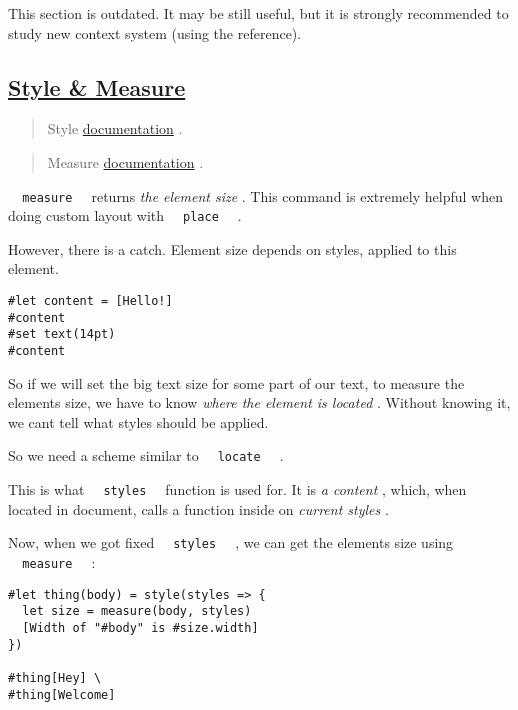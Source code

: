 This section is outdated. It may be still useful, but it is strongly
recommended to study new context system (using the reference).

\subsection{\texorpdfstring{\hyperref[style--measure]{Style \&
Measure}}{Style \& Measure}}\label{style--measure}

\begin{quote}
Style
\href{https://typst.app/docs/reference/foundations/style/}{documentation}
.
\end{quote}

\begin{quote}
Measure
\href{https://typst.app/docs/reference/layout/measure/}{documentation} .
\end{quote}

\texttt{\ }{\texttt{\ measure\ }}\texttt{\ } returns \emph{the element
size} . This command is extremely helpful when doing custom layout with
\texttt{\ }{\texttt{\ place\ }}\texttt{\ } .

However, there is a catch. Element size depends on styles, applied to
this element.

\begin{verbatim}
#let content = [Hello!]
#content
#set text(14pt)
#content
\end{verbatim}

\pandocbounded{}

So if we will set the big text size for some part of our text, to
measure the element\textquotesingle s size, we have to know \emph{where
the element is located} . Without knowing it, we can\textquotesingle t
tell what styles should be applied.

So we need a scheme similar to
\texttt{\ }{\texttt{\ locate\ }}\texttt{\ } .

This is what \texttt{\ }{\texttt{\ styles\ }}\texttt{\ } function is
used for. It is \emph{a content} , which, when located in document,
calls a function inside on \emph{current styles} .

Now, when we got fixed \texttt{\ }{\texttt{\ styles\ }}\texttt{\ } , we
can get the element\textquotesingle s size using
\texttt{\ }{\texttt{\ measure\ }}\texttt{\ } :

\begin{verbatim}
#let thing(body) = style(styles => {
  let size = measure(body, styles)
  [Width of "#body" is #size.width]
})

#thing[Hey] \
#thing[Welcome]
\end{verbatim}

